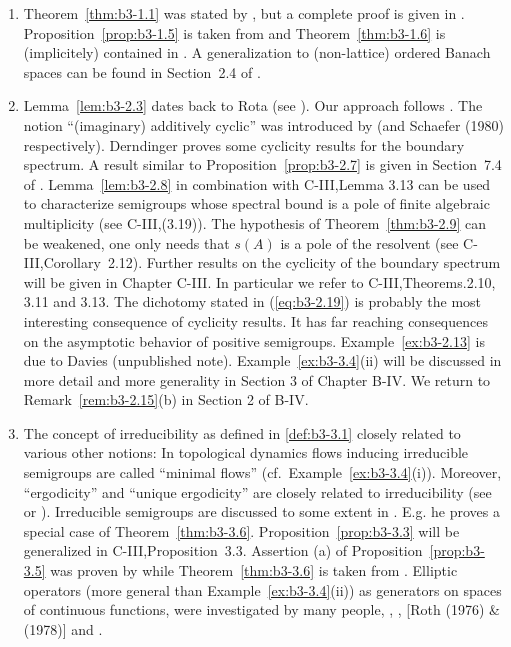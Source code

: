 \begin{enumerate}[label=\emph{Section \arabic*:}, wide]
\item
Theorem~\ref{thm:b3-1.1} was stated by \citet{karlin:1959}, but a complete proof is given in \citet{derndinger:1980}.
Proposition~\ref{prop:b3-1.5}  is taken from \citet{greiner:1982} and Theorem~\ref{thm:b3-1.6} is (implicitely) contained in \citet{derndingernagel:1979}.
A generalization to (non-lattice) ordered Banach spaces can be found in Section~2.4 of \citet{battyrobinson:1984}.

\item
Lemma~\ref{lem:b3-2.3} dates back to Rota (see \citet{schaefer:1974}).
Our approach follows \citet{greiner:1981}.
The notion \enquote{(imaginary) additively cyclic} was introduced by \citet{derndinger:1980} (and {Schaefer (1980)} respectively).
Derndinger proves some cyclicity results for the boundary spectrum.
A result similar to Proposition~\ref{prop:b3-2.7} is given in Section~7.4 of \citet{davies:1980}.
Lemma~\ref{lem:b3-2.8} in combination with C-III,Lemma 3.13 can be used to characterize semigroups whose spectral bound is a pole of finite algebraic multiplicity (see C-III,(3.19)).
The hypothesis of Theorem~\ref{thm:b3-2.9} can be weakened, one only needs that $s(A)$ is a pole of the resolvent (see C-III,Corollary~2.12).
Further results on the cyclicity of the boundary spectrum will be given in Chapter C-III.
In particular we refer to C-III,Theorems.2.10, 3.11 and 3.13.
The dichotomy stated in (\ref{eq:b3-2.19})  is probably the most interesting consequence of cyclicity results.
It has far reaching consequences on the asymptotic behavior of positive semigroups.
Example~\ref{ex:b3-2.13} is due to Davies (unpublished note).
Example~\ref{ex:b3-3.4}(ii) will be discussed in more detail and more generality in Section 3 of Chapter B-IV.
We return to Remark~\ref{rem:b3-2.15}(b) in Section 2 of B-IV.

\item
The concept of irreducibility as defined in \ref{def:b3-3.1} closely related to various other notions:
In topological dynamics flows inducing irreducible semigroups are called \enquote{minimal flows} (cf.\ Example~\ref{ex:b3-3.4}(i)).
Moreover, \enquote{ergodicity} and \enquote{unique ergodicity} are closely related to irreducibility (see\citet{cornfeldfominsinai:1982} or \citet{krengel:1985}).
Irreducible semigroups are discussed to some extent in \citet{davies:1980}.
E.g. he proves a special case of Theorem~\ref{thm:b3-3.6}.
Proposition~\ref{prop:b3-3.3} will be generalized in C-III,Proposition~3.3.
Assertion (a) of Proposition~\ref{prop:b3-3.5} was proven by \citet{schaefer:1983} while Theorem~\ref{thm:b3-3.6} is taken from \citet{greiner:1982}.
Elliptic operators (more general than Example~\ref{ex:b3-3.4}(ii)) as generators on spaces of continuous functions, were investigated by many people, \eg \citet{bonycourrègepriouret:1968}, \citet{kuhn:1985}, [Roth (1976) \& (1978)] and \citet{stewart:1974}.


\end{enumerate}
